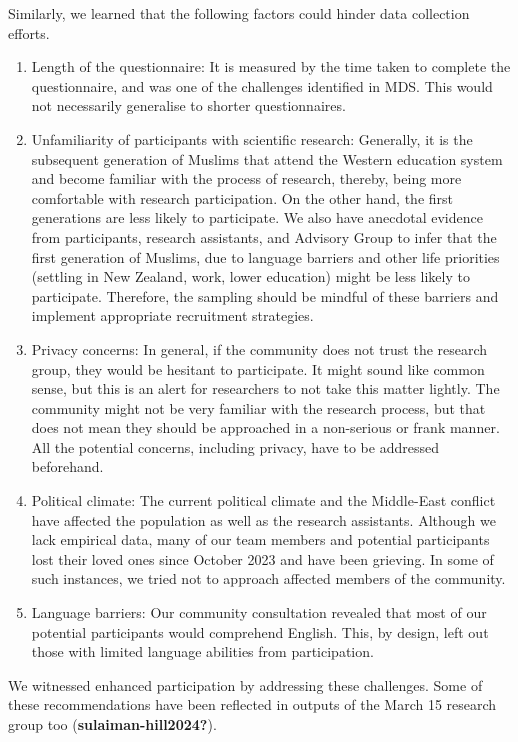 \documentclass[
]{interact}
\providecommand{\tightlist}{%
  \setlength{\itemsep}{0pt}\setlength{\parskip}{0pt}}\usepackage{longtable,booktabs,array}
\begin{document}
Similarly, we learned that the following factors could hinder data
collection efforts.

\begin{enumerate}
\def\labelenumi{\arabic{enumi}.}
\tightlist
\item
  Length of the questionnaire: It is measured by the time taken to
  complete the questionnaire, and was one of the challenges identified
  in MDS. This would not necessarily generalise to shorter
  questionnaires.
\item
  Unfamiliarity of participants with scientific research: Generally, it
  is the subsequent generation of Muslims that attend the Western
  education system and become familiar with the process of research,
  thereby, being more comfortable with research participation. On the
  other hand, the first generations are less likely to participate. We
  also have anecdotal evidence from participants, research assistants,
  and Advisory Group to infer that the first generation of Muslims, due
  to language barriers and other life priorities (settling in New
  Zealand, work, lower education) might be less likely to participate.
  Therefore, the sampling should be mindful of these barriers and
  implement appropriate recruitment strategies.
\item
  Privacy concerns: In general, if the community does not trust the
  research group, they would be hesitant to participate. It might sound
  like common sense, but this is an alert for researchers to not take
  this matter lightly. The community might not be very familiar with the
  research process, but that does not mean they should be approached in
  a non-serious or frank manner. All the potential concerns, including
  privacy, have to be addressed beforehand.
\item
  Political climate: The current political climate and the Middle-East
  conflict have affected the population as well as the research
  assistants. Although we lack empirical data, many of our team members
  and potential participants lost their loved ones since October 2023
  and have been grieving. In some of such instances, we tried not to
  approach affected members of the community.
\item
  Language barriers: Our community consultation revealed that most of
  our potential participants would comprehend English. This, by design,
  left out those with limited language abilities from participation.
\end{enumerate}

We witnessed enhanced participation by addressing these challenges. Some
of these recommendations have been reflected in outputs of the March 15
research group too (\textbf{sulaiman-hill2024?}).
\end{document}
